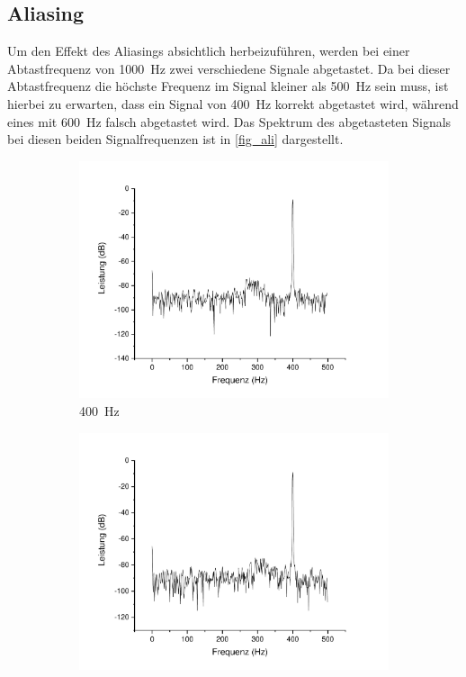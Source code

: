 \documentclass[
a4paper,
12pt,
pagesize,
ngerman
]{scrartcl}
\begin{document}
	\subsection{Aliasing}
	Um den Effekt des Aliasings absichtlich herbeizuführen, werden bei einer Abtastfrequenz von \SI{1000}{\hertz} zwei verschiedene Signale abgetastet.
	Da bei dieser Abtastfrequenz die höchste Frequenz im Signal kleiner als \SI{500}{\hertz} sein muss, ist hierbei zu erwarten, dass ein Signal von \SI{400}{\hertz} korrekt abgetastet wird, während eines mit \SI{600}{\hertz} falsch abgetastet wird.
	Das Spektrum des abgetasteten Signals bei diesen beiden Signalfrequenzen ist in \cref{fig_ali} dargestellt.
	
	\begin{figure}[H]
		\centering
		\begin{subfigure}[t]{0.5\textwidth}
			\centering
			\includegraphics[width=1\textwidth]{Origin-Files/aliasing_abtast1000bei400sig}
			\caption{\SI{400}{\hertz}}
		\end{subfigure}%
		\begin{subfigure}[t]{0.5\textwidth}
			\centering
			\includegraphics[width=1\textwidth]{Origin-Files/aliasing_abtast1000bei600sig}

\end{subfigure}
\end{figure}
\end{document}
